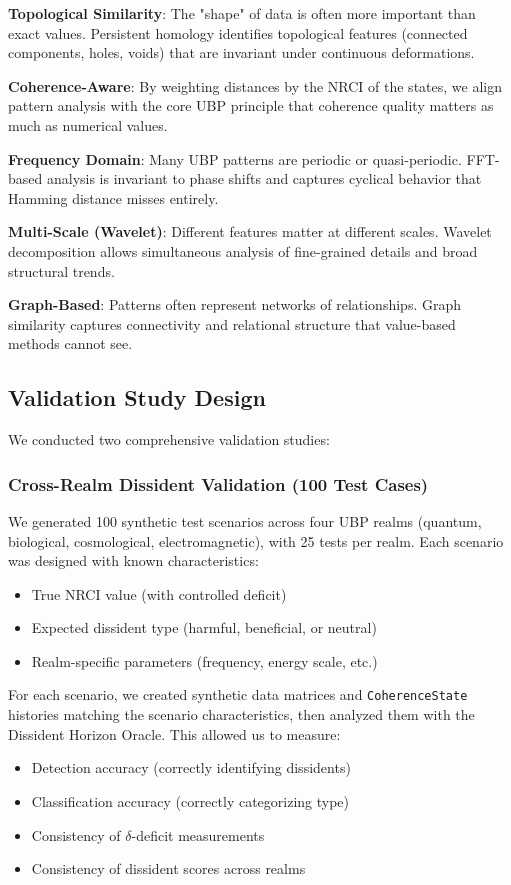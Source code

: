 \documentclass[12pt, a4paper]{article}
\begin{document}
\textbf{Topological Similarity}: The "shape" of data is often more important than exact values. Persistent homology identifies topological features (connected components, holes, voids) that are invariant under continuous deformations.

\textbf{Coherence-Aware}: By weighting distances by the NRCI of the states, we align pattern analysis with the core UBP principle that coherence quality matters as much as numerical values.

\textbf{Frequency Domain}: Many UBP patterns are periodic or quasi-periodic. FFT-based analysis is invariant to phase shifts and captures cyclical behavior that Hamming distance misses entirely.

\textbf{Multi-Scale (Wavelet)}: Different features matter at different scales. Wavelet decomposition allows simultaneous analysis of fine-grained details and broad structural trends.

\textbf{Graph-Based}: Patterns often represent networks of relationships. Graph similarity captures connectivity and relational structure that value-based methods cannot see.

\subsection{Validation Study Design}

We conducted two comprehensive validation studies:

\subsubsection{Cross-Realm Dissident Validation (100 Test Cases)}

We generated 100 synthetic test scenarios across four UBP realms (quantum, biological, cosmological, electromagnetic), with 25 tests per realm. Each scenario was designed with known characteristics:
\begin{itemize}
    \item True NRCI value (with controlled deficit)
    \item Expected dissident type (harmful, beneficial, or neutral)
    \item Realm-specific parameters (frequency, energy scale, etc.)
\end{itemize}

For each scenario, we created synthetic data matrices and \texttt{CoherenceState} histories matching the scenario characteristics, then analyzed them with the Dissident Horizon Oracle. This allowed us to measure:
\begin{itemize}
    \item Detection accuracy (correctly identifying dissidents)
    \item Classification accuracy (correctly categorizing type)
    \item Consistency of $\delta$-deficit measurements
    \item Consistency of dissident scores across realms
\end{itemize}
\end{document}
